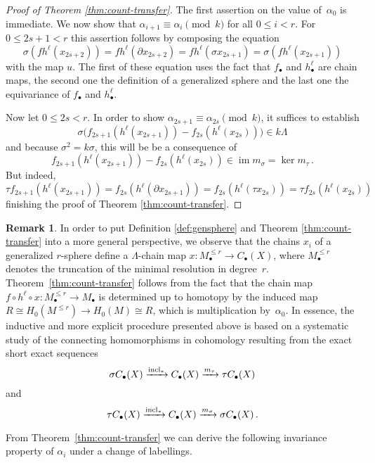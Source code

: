 \documentclass[11pt,a4paper,draft]{article}
\newcommand\isom{\cong}
\newcommand{\cmps}{\circ}
\newcommand\xto{\xrightarrow}
\DeclareMathOperator\Bild{im}
\DeclareMathOperator\Kern{ker}
\newcommand\im{\Bild}
\renewcommand\ker{\Kern}
\newcommand{\dd}{\partial}
\theoremstyle{definition}
\newtheorem{remark}[theorem]{Remark}
\begin{document}
\begin{proof}[Proof of Theorem \ref{thm:count-transfer}]
The first assertion on the value of~$\alpha_0$ is immediate.
%
We now show that $\alpha_{i+1}\equiv\alpha_i\pmod k$ for all $0\le i<r$.
%
For  $0 \leq 2s+1 < r$ this assertion follows by composing the equation
\[
     \sigma  (f h^{\ell} (x_{2s+2}))  =
     f h^{\ell}( \partial x_{2s+2}) =
     f h^{\ell}( \sigma x_{2s+1})  = 
     \sigma ( f h^{\ell} (x_{2s+1})) 
\]
with the map $u$. The first of these equation uses the fact that $f_\bullet$ and $h_\bullet^{\ell}$ are chain
maps, the second one the definition of a generalized sphere and the last one the equivariance of 
 $f_\bullet$ and $h_\bullet^{\ell}$.


Now let $0\le 2s<r$.  In order to show
$\alpha_{2s+1}\equiv\alpha_{2s}\pmod k$, it suffices to establish
\[
   \sigma \big( f_{2s+1}(h^\ell(x_{2s+1}))-f_{2s}(h^\ell(x_{2s})) \big) \in k\Lambda
\]
and because $\sigma^2=k\sigma$, this will be be a consequence of
\[
   f_{2s+1}(h^\ell(x_{2s+1}))-f_{2s}(h^\ell(x_{2s}))\in\im m_\sigma=\ker m_\tau \, .
\]
But indeed, 
\[
    \tau f_{2s+1}(h^\ell(x_{2s+1})) =f_{2s}(h^\ell(\dd x_{2s+1})) = f_{2s}(h^\ell(\tau x_{2s}))
    =\tau f_{2s}(h^\ell(x_{2s}))  
\]
finishing the proof of Theorem \ref{thm:count-transfer}. 
\end{proof} 


\begin{remark} In order to put Definition  
\ref{def:gensphere} and Theorem \ref{thm:count-transfer} 
into a more general perspective, we 
observe that the chains $x_i$ of a generalized $r$-sphere
define a $\Lambda$-chain map $x\colon M_\bullet^{\le
  r}\to C_\bullet(X)$, where $M_\bullet^{\le r}$ denotes the truncation of
the minimal resolution in degree~$r$.  Theorem~\ref{thm:count-transfer}
follows from the fact that the chain map $f\cmps
h^\ell\cmps x\colon M_\bullet^{\le r}\to M_\bullet$ is determined up to
homotopy by the induced map $R\isom H_0(M^{\le r})\to H_0(M)\isom R$, 
which is multiplication by~$\alpha_0$. In essence, the inductive and more 
explicit procedure presented above is based on 
a systematic study of the connecting homomorphisms in cohomology 
resulting from the exact short exact sequences
\[
  \sigma C_\bullet(X)\xto{{\rm incl_\ast}}C_\bullet(X)\xto{m_\tau}\tau C_\bullet(X)
\]
and 
\[
   \tau C_\bullet(X)\xto{{\rm incl_\ast}}C_\bullet(X)\xto{m_\sigma}\sigma C_\bullet(X) \, . 
\]
\end{remark} 


From Theorem~\ref{thm:count-transfer} we can derive the following
invariance property of $\alpha_i$ under a change of labellings.
\end{document}
